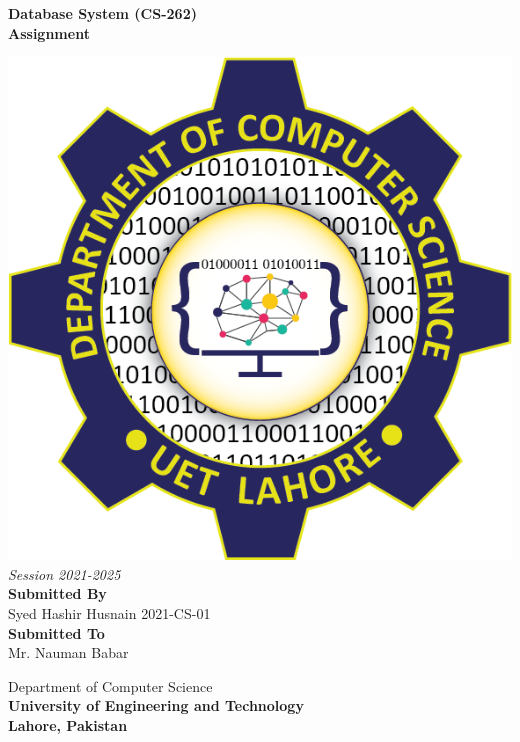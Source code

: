 \documentclass[12pt,a4paper]{report}
\begin{document}
\begin{center}
\thispagestyle{empty}
	\vspace{2cm}
	\textbf {\huge Database System (CS-262)}\\
	\vspace {0.5cm}
	\textbf{\Large Assignment}\\
	\vspace{1cm}
	
	\includegraphics[scale=0.2]{cslogo}\\
	
	\vspace{1cm}
	\textit{\Large {Session 2021-2025}}\\
	\vspace{2cm}
	\vspace{1cm}
	\textbf{\LARGE Submitted By}\\
	\vspace{0.5cm}
	\Large {Syed Hashir Husnain \hspace{1cm} 2021-CS-01}
	\\
	
	\vspace{2cm}
	\textbf{\LARGE Submitted To}\\
	\vspace{0.5cm}
	\Large Mr. Nauman Babar
	
	\vspace{2cm}	
	\LARGE Department of Computer Science\\
	\vspace{0.5cm}
	\textbf{\LARGE University of Engineering and Technology} \\
	\textbf{Lahore, Pakistan}	
\end{center}
\end{document}
